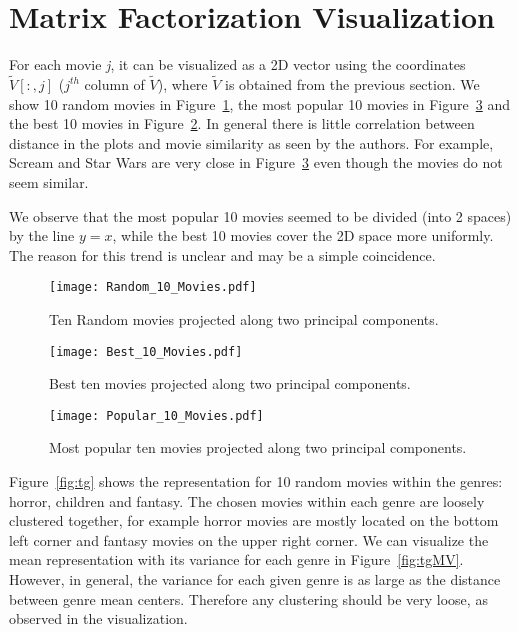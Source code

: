 \section{Matrix Factorization Visualization}

For each movie \textit{j}, it can be visualized as a 2D vector using the coordinates $\tilde{V}[:,j]$ ($j^{th}$ column of $\tilde{V}$), where $\tilde{V}$ is obtained from the previous section. We show 10 random movies in Figure~\ref{fig:tenRandom}, the most popular 10 movies in Figure~\ref{fig:tenMostPopular} and the best 10 movies in Figure~\ref{fig:tenBest}. In general there is little correlation between distance in the plots and movie similarity as seen by the authors. For example, Scream and Star Wars are very close in Figure~\ref{fig:tenMostPopular} even though the movies do not seem similar. 

We observe that the most popular 10 movies seemed to be divided (into 2 spaces) by the line $y = x$, while the best 10 movies cover the 2D space more uniformly. The reason for this trend is unclear and may be a simple coincidence.  

\begin{figure}[H]
\centering
\texttt{[image: Random\_10\_Movies.pdf]}
 \caption{Ten Random movies projected along two principal components.}
\label{fig:tenRandom}
\end{figure}


\begin{figure}[H]
\centering
\texttt{[image: Best\_10\_Movies.pdf]}
 \caption{Best ten movies projected along two principal components.}
\label{fig:tenBest}
\end{figure}


\begin{figure}[H]
\centering
\texttt{[image: Popular\_10\_Movies.pdf]}
 \caption{Most popular ten movies projected along two principal components.}
\label{fig:tenMostPopular}
\end{figure}

Figure~\ref{fig:tg} shows the representation for 10 random movies within the genres: horror, children and fantasy. The chosen movies within each genre are loosely clustered together, for example horror movies are mostly located on the bottom left corner and fantasy movies on the upper right corner. We can visualize the mean representation with its variance for each genre in Figure~\ref{fig:tgMV}. However, in general, the variance for each given genre is as large as the distance between genre mean centers. Therefore any clustering should be very loose, as observed in the visualization.

